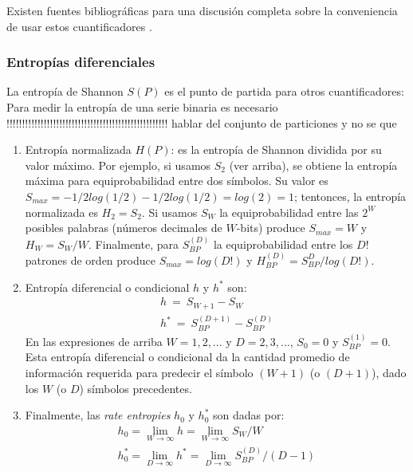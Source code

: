 Existen fuentes bibliográficas para una discusión completa sobre la conveniencia de usar estos cuantificadores \cite{DeMicco2008,Rosso2010,Rosso2012,Lopez-Ruiz1995,Martin2006,Wackerbauer1994,Rosso2007A}.

\subsubsection{Entropías diferenciales}
\label{subsec:addquanti}

La entropía de Shannon $S(P)$ es el punto de partida para otros cuantificadores:
Para medir la entropía de una serie binaria es necesario 
!!!!!!!!!!!!!!!!!!!!!!!!!!!!!!!!!!!!!!!!!!!!!!!!!!!!
	hablar del conjunto de particiones y no se que
	

\begin{enumerate}
	\item Entropía normalizada $H(P)$: es la entropía de Shannon dividida por su valor máximo. Por ejemplo, si usamos $S_2$ (ver arriba), se obtiene la entropía máxima para equiprobabilidad entre dos símbolos. Su valor es $S_{max}=-1/2 log(1/2)-1/2 log(1/2)=log(2)=1$; tentonces, la entropía normalizada es $H_2=S_2$. Si usamos $S_W$ la equiprobabilidad entre las $2^W$ posibles palabras (números decimales de $W$-bits) produce $S_{max}=W$ y $H_W=S_W/W$. Finalmente, para $S^{(D)}_{BP}$ la equiprobabilidad entre los $D!$ patrones de orden produce $S_{max}= log(D!)$ y $H^{(D)}_{BP}=S^D_{BP}/log(D!)$.
	\item Entropía diferencial o condicional $h$ y $h^*$ son:
	\begin{eqnarray}
	h~=~S_{W+1}-S_W\\
	h^*~=~S_{BP}^{(D+1)}-S_{BP}^{(D)}
	\end{eqnarray}
	En las expresiones de arriba $W=1,2,...$ y $D=2,3,...$, $S_0=0$ y $S_{BP}^{(1)}=0$. Esta entropía diferencial o condicional da la cantidad promedio de información requerida para predecir el símbolo $(W+1)$ (o $(D+1)$), dado los $W$ (o $D$) símbolos precedentes.
	\item Finalmente, las \emph{rate entropies} $h_0$ y $h_0^*$ \cite{Ebeling2001,Amigo2005} son dadas por:
	\begin{eqnarray}
	h_0=\lim\limits_{W\rightarrow \infty} h=\lim\limits_{W\rightarrow \infty}{S_{W}/W }\\
	h^*_0= \lim\limits_{D\rightarrow \infty} h^*=\lim\limits_{D\rightarrow \infty}{S^{(D)}_{BP}/(D-1)}
	\end{eqnarray}
\end{enumerate}

